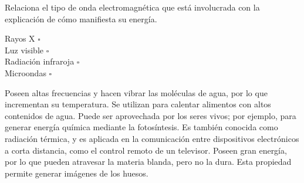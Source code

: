 Relaciona el tipo de onda electromagnética  que está involucrada con la  explicación de cómo manifiesta su energía.

\begin{minipage}{0.3\textwidth}
    \begin{flushright}
        Rayos X $\square$\\                   \vspace{1cm}
        Luz visible $\square$\\               \vspace{1cm}
        Radiación infraroja $\square$\\       \vspace{1cm}
        Microondas $\square$
    \end{flushright}
    \end{minipage}\hfill
    \begin{minipage}{0.7\textwidth}
    \begin{checkboxes}
        \choice Poseen altas frecuencias y hacen vibrar las moléculas de agua, por lo que incrementan su temperatura. Se utilizan para calentar alimentos con altos contenidos de agua.
        \choice Puede ser aprovechada por los seres vivos; por ejemplo, para generar energía química mediante la fotosíntesis.
        \choice Es también conocida como radiación térmica, y es aplicada en la comunicación entre dispositivos electrónicos a corta distancia, como el control remoto de un televisor.
        \choice Poseen gran energía, por lo que pueden atravesar la materia blanda, pero no la dura. Esta propiedad permite generar imágenes de los huesos.
    \end{checkboxes}
\end{minipage}%